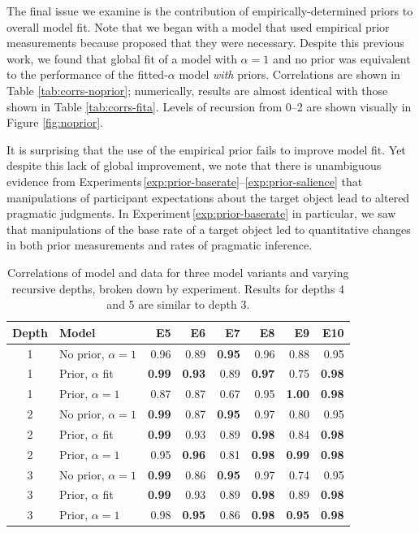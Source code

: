 \documentclass[man,noapacite]{apa2}
\newcounter{Experiment}
\newcommand{\exptref}[1]{Experiment\,\ref{#1}}
\newcommand{\exptrefrange}[2]{Experiments\,\ref{#1}--\ref{#2}}
\begin{document}
The final issue we examine is the contribution of empirically-determined priors to overall model fit. Note that we began with a model that used empirical prior measurements because  proposed that they were necessary. Despite this previous work, we found that global fit of a model with $\alpha=1$ and no prior was equivalent to the performance of the fitted-$\alpha$ model \emph{with} priors. Correlations are shown in Table \ref{tab:corrs-noprior}; numerically, results are almost identical with those shown in Table \ref{tab:corrs-fita}. Levels of recursion from 0--2 are shown visually in Figure \ref{fig:noprior}.

It is surprising that the use of the empirical prior fails to improve model fit. Yet despite this lack of global improvement, we note that there is unambiguous evidence from \exptrefrange{exp:prior-baserate}{exp:prior-salience} that manipulations of participant expectations about the target object lead to altered pragmatic judgments. In \exptref{exp:prior-baserate} in particular, we saw that manipulations of the base rate of a target object led to quantitative changes in both prior measurements and rates of pragmatic inference.

\begin{table}[ht]
\centering
\begin{tabular}{clrrrrrr}
  \hline
Depth & Model & E5 & E6 & E7 & E8 & E9 & E10 \\
  \hline
  1 & No prior, $\alpha=1$ & 0.96 & 0.89 & {\bf 0.95} & 0.96 & 0.88 & 0.95 \\
    1 & Prior, $\alpha$ fit & {\bf 0.99} & {\bf 0.93} & 0.89 & {\bf 0.97} & 0.75 & {\bf 0.98} \\
    1 & Prior, $\alpha=1$ & 0.87 & 0.87 & 0.67 & 0.95 & {\bf 1.00} & {\bf 0.98} \\
  \hline
    2 & No prior, $\alpha=1$ & {\bf 0.99} & 0.87 & {\bf 0.95} & 0.97 & 0.80 & 0.95 \\
    2 & Prior, $\alpha$ fit & {\bf 0.99} & 0.93 & 0.89 & {\bf 0.98} & 0.84 & {\bf 0.98} \\
    2 & Prior, $\alpha=1$ & 0.95 & {\bf 0.96} & 0.81 & {\bf 0.98} & {\bf 0.99} & {\bf 0.98} \\
  \hline
    3 & No prior, $\alpha=1$ & {\bf 0.99} & 0.86 & {\bf 0.95} & 0.97 & 0.74 & 0.95 \\
    3 & Prior, $\alpha$ fit & {\bf 0.99} & 0.93 & 0.89 & {\bf 0.98} & 0.89 & {\bf 0.98} \\
    3 & Prior, $\alpha=1$ & 0.98 & {\bf 0.95} & 0.86 & {\bf 0.98} & {\bf 0.95} & {\bf 0.98} \\
  \hline
\end{tabular}
\caption{\label{tab:expts-corrs} Correlations of model and data for three model variants and varying recursive depths, broken down by experiment. Results for depths 4 and 5 are similar to depth 3.}
\end{table}
\end{document}
